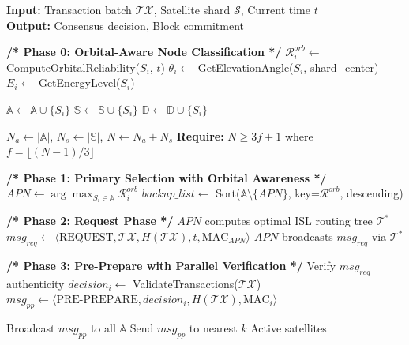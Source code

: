 \begin{algorithm}[H] \small
\caption{Satellite-Adapted SBFT (SA-SBFT) Consensus}
\label{alg:sa_sbft}
\textbf{Input:} Transaction batch $\mathcal{TX}$, Satellite shard $\mathcal{S}$, Current time $t$ \\
\textbf{Output:} Consensus decision, Block commitment
\begin{algorithmic}[1]

\Statex \textbf{/* Phase 0: Orbital-Aware Node Classification */}
    \State $\mathcal{R}^{orb}_i \leftarrow$ ComputeOrbitalReliability($S_i$, $t$)
    \State $\theta_i \leftarrow$ GetElevationAngle($S_i$, shard\_center)
    \State $E_i \leftarrow$ GetEnergyLevel($S_i$)
    
        \State $\mathbb{A} \leftarrow \mathbb{A} \cup \{S_i\}$ 
        \State $\mathbb{S} \leftarrow \mathbb{S} \cup \{S_i\}$ 
    \Else
        \State $\mathbb{D} \leftarrow \mathbb{D} \cup \{S_i\}$ 
    \EndIf
\EndFor

\State $N_a \leftarrow |\mathbb{A}|$, $N_s \leftarrow |\mathbb{S}|$, $N \leftarrow N_a + N_s$
\State \textbf{Require:} $N \geq 3f + 1$ where $f = \lfloor(N-1)/3\rfloor$

\Statex \textbf{/* Phase 1: Primary Selection with Orbital Awareness */}
\State $APN \leftarrow \arg\max_{S_i \in \mathbb{A}} \mathcal{R}^{orb}_i$
\State $backup\_list \leftarrow$ Sort($\mathbb{A} \setminus \{APN\}$, key=$\mathcal{R}^{orb}$, descending)

\Statex \textbf{/* Phase 2: Request Phase */}
\State $APN$ computes optimal ISL routing tree $\mathcal{T}^*$
\State $msg_{req} \leftarrow \langle \text{REQUEST}, \mathcal{TX}, H(\mathcal{TX}), t, \text{MAC}_{APN} \rangle$
\State $APN$ broadcasts $msg_{req}$ via $\mathcal{T}^*$

\Statex \textbf{/* Phase 3: Pre-Prepare with Parallel Verification */}
    \State Verify $msg_{req}$ authenticity
    \State $decision_i \leftarrow$ ValidateTransactions($\mathcal{TX}$)
    \State $msg_{pp} \leftarrow \langle \text{PRE-PREPARE}, decision_i, H(\mathcal{TX}), \text{MAC}_i \rangle$
    
        \State Broadcast $msg_{pp}$ to all $\mathbb{A}$ 
    \Else
        \State Send $msg_{pp}$ to nearest $k$ Active satellites 
    \EndIf
\EndFor


\end{algorithmic}
\end{algorithm}
